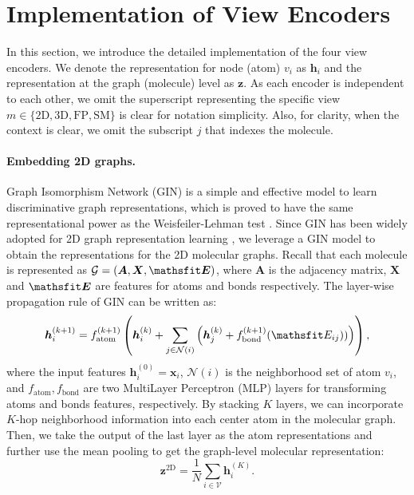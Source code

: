 \appendixprefix

\section{Implementation of View Encoders}
\label{supp:view-encoders}

In this section, we introduce the detailed implementation of the four view encoders.
We denote the representation for node (atom) \(v_i\) as \(\bm{h}_i\) and the representation at the graph (molecule) level as \(\bm{z}\).
As each encoder is independent to each other, we omit the superscript representing the specific view \(m \in \{\text{2D}, \text{3D}, \text{FP}, \text{SM}\}\) is clear for notation simplicity.
Also, for clarity, when the context is clear, we omit the subscript \(j\) that indexes the molecule.

\paragraph{Embedding 2D graphs.}
Graph Isomorphism Network (GIN) \cite{Xu:2019ty} is a simple and effective model to learn discriminative graph representations, which is proved to have the same representational power as the Weisfeiler-Lehman test \cite{Weisfeiler:1968wl}.
Since GIN has been widely adopted for 2D graph representation learning \cite{Hu:2020uz,You:2021wl,You:2020ut}, we leverage a GIN model to obtain the representations for the 2D molecular graphs.
Recall that each molecule is represented as \(\mathcal{G} = (\bm{A}, \bm{X}, \tens{E})\), where \(\bm{A}\) is the adjacency matrix, \(\bm{X}\) and \(\tens{E}\) are features for atoms and bonds respectively.
The layer-wise propagation rule of GIN can be written as:
\begin{equation}
	\bm{h}_i^{(k + 1)} = f_{\text{atom}}^{(k+1)}\left(
	\bm{h}_i^{(k)} + \sum_{j \in\mathcal{N}(i)}
	\left(\bm{h}_j^{(k)} + f_{\text{bond}}^{(k+1)}(\etens{E}_{ij}))
	\right)\right),
\end{equation}
where the input features \(\bm{h}^{(0)}_i = \bm{x}_i\), \(\mathcal{N}(i)\) is the neighborhood set of atom \(v_i\), and \(f_{\text{atom}}, f_{\text{bond}}\) are two MultiLayer Perceptron (MLP) layers for transforming atoms and bonds features, respectively.
By stacking \(K\) layers, we can incorporate $K$-hop neighborhood information into each center atom in the molecular graph.
Then, we take the output of the last layer as the atom representations and further use the mean pooling to get the graph-level molecular representation:
\begin{equation}
\bm{z}^\text{2D} = \frac{1}{N}\sum_{i\in \mathcal{V}}\bm{h}_i^{(K)}.
\end{equation}



